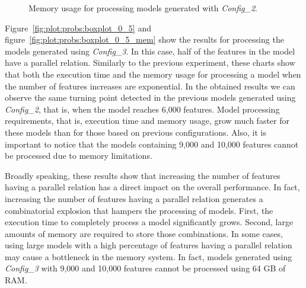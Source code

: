 \begin{figure}[h]
\begin{minipage}[b]{0.48\textwidth}
		\caption{Memory usage for processing models generated with \textit{Config\_2}.}\label{fig:plot:probs:boxplot_0_2_mem}
	\end{minipage}
\end{figure}

Figure~\ref{fig:plot:probs:boxplot_0_5} and figure~\ref{fig:plot:probs:boxplot_0_5_mem} show the results for processing the models generated using \textit{Config\_3}. In this case, half of the features in the model have a parallel relation. Similarly to the previous experiment, these charts show that both the execution time and the memory usage for processing a model when the number of features increases are exponential. In the obtained results we can observe the same turning point detected in the previous models generated using \textit{Config\_2}, that is, when the model reaches 6,000 features. Model processing requirements, that is, execution time and memory usage, grow much faster for these models than for those based on previous configurations. Also, it is important to notice that the models containing 9,000 and 10,000 features cannot be processed due to memory limitations.

Broadly speaking, these results show that increasing the number of features having a parallel relation has a direct impact on the overall performance. In fact, increasing the number of features having a parallel relation generates a combinatorial explosion that hampers the processing of models. First, the execution time to completely process a model significantly grows. Second, large amounts of memory are required to store those combinations. In some cases, using large models with a high percentage of features having a parallel relation may cause a bottleneck in the memory system. In fact, models generated using \textit{Config\_3} with 9,000 and 10,000 features cannot be processed using 64 GB of RAM.



